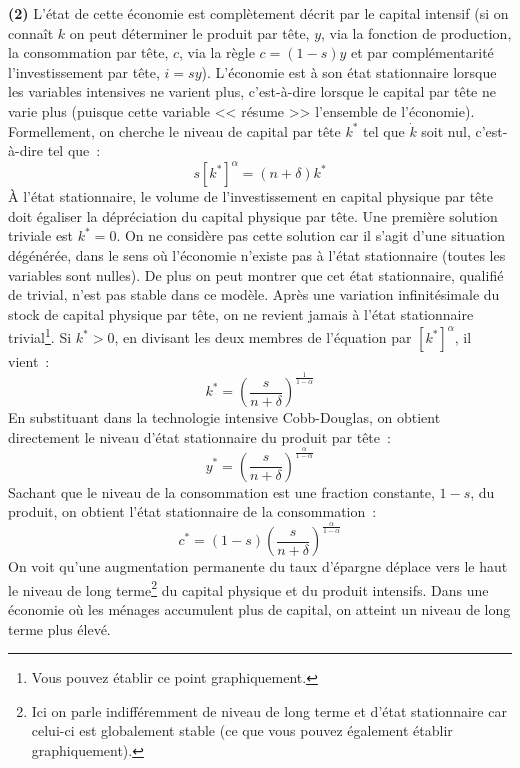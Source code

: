 \documentclass[10pt,a4paper,notitlepage,onecolumn]{article}
\newcommand{\question}[1]{\textbf{(#1)}}
\begin{document}
\question{2} L'état de cette économie est complètement
décrit par le capital intensif (si on connaît $k$ on peut déterminer
le produit par tête, $y$, via la fonction de production, la
consommation par tête, $c$, via la règle $c=(1-s)y$ et par
complémentarité l'investissement par tête, $i = sy$). L'économie est
à son état stationnaire lorsque les variables intensives ne varient
plus, c'est-à-dire lorsque le capital par tête ne varie plus
(puisque cette variable << résume >> l'ensemble de l'économie).
Formellement, on cherche le niveau de capital par tête $k^{\ast}$
tel que $\dot{k}$ soit nul, c'est-à-dire tel que~:
\[
s\left[k^{\ast}\right]^{\alpha} = (n+\delta)k^{\ast}
\]
À l'état stationnaire, le volume de l'investissement en capital physique par tête doit 
égaliser la dépréciation du capital physique par tête.  
Une première solution triviale est $k^{\ast}=0$. On ne considère pas
cette solution car il s'agit d'une situation dégénérée, dans le sens
où l'économie n'existe pas à l'état stationnaire (toutes les
variables sont nulles). De plus on peut montrer que cet état
stationnaire, qualifié de trivial, n'est pas stable dans ce modèle.
Après une variation infinitésimale du stock de capital physique par
tête, on ne revient jamais à l'état stationnaire
trivial\footnote{Vous pouvez établir ce point graphiquement.}. Si
$k^{\ast}>0$, en divisant les deux membres de l'équation par
$\left[k^{\ast}\right]^{\alpha}$, il vient~:
\[
k^{\ast} = \left(\frac{s}{n+\delta}\right)^{\frac{1}{1-\alpha}}
\]
En substituant dans la technologie intensive Cobb-Douglas, on
obtient directement le niveau d'état stationnaire du produit par
tête~:
\[
y^{\ast} = \left(\frac{s}{n+\delta}\right)^{\frac{\alpha}{1-\alpha}}
\]
Sachant que le niveau de la consommation est une fraction constante,
$1-s$, du produit, on obtient l'état stationnaire de la
consommation~:
\[
c^{\ast} =
(1-s)\left(\frac{s}{n+\delta}\right)^{\frac{\alpha}{1-\alpha}}
\]
On voit qu'une augmentation permanente du taux d'épargne déplace
vers le haut le niveau de long terme\footnote{Ici on parle
indifféremment de niveau de long terme et d'état stationnaire car
celui-ci est globalement stable (ce que vous pouvez également
établir graphiquement).} du capital physique et du produit
intensifs. Dans une économie où les ménages accumulent plus de
capital, on atteint un niveau de long terme plus élevé.\newline
\end{document}
